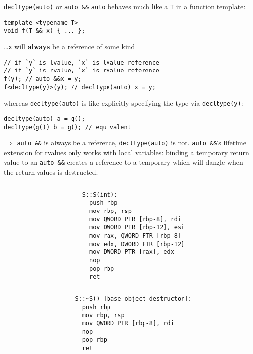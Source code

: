 \documentclass[compress,aspectratio=1610]{beamer}
\newcommand{\inputcpplisting}[1]{}
\begin{document}
\begin{frame}[fragile]{\texttt{decltype(auto)} or \texttt{auto \&\&}}
    \texttt{auto} behaves much like a \texttt{T} in a function template:
    \begin{lstlisting}
template <typename T>
void f(T && x) { ... };
    \end{lstlisting}
    \ldots \texttt{x} will \textbf{always} be a reference of some kind
    \begin{lstlisting}
// if `y` is lvalue, `x` is lvalue reference
// if `y` is rvalue, `x` is rvalue reference
f(y); // auto &&x = y;
f<decltype(y)>(y); // decltype(auto) x = y;
    \end{lstlisting}
    whereas \texttt{decltype(auto)} is like explicitly specifying the type via \texttt{decltype(y)}:
    \begin{lstlisting}
decltype(auto) a = g();
decltype(g()) b = g(); // equivalent
    \end{lstlisting}

    $\Rightarrow$ \texttt{auto \&\&} is always be a reference, \texttt{decltype(auto)} is not. \texttt{auto \&\&}'s lifetime extension for rvalues only works with local variables: binding a temporary return value to an \texttt{auto \&\&} creates a reference to a temporary which will dangle when the return values is destructed. 
\end{frame}

\begin{frame}[fragile]
    \begin{columns}
        \begin{column}{.5\textwidth}
            \inputcpplisting{snippet7}
        \end{column}
        \begin{column}{.4\textwidth}
            \begin{lstlisting}[language={},morekeywords={rdi}]
S::S(int):
  push rbp
  mov rbp, rsp
  mov QWORD PTR [rbp-8], rdi
  mov DWORD PTR [rbp-12], esi
  mov rax, QWORD PTR [rbp-8]
  mov edx, DWORD PTR [rbp-12]
  mov DWORD PTR [rax], edx
  nop
  pop rbp
  ret
            \end{lstlisting}
        \end{column}
    \end{columns}
\end{frame}

\begin{frame}[fragile]
    \begin{columns}
        \begin{column}{.5\textwidth}
            \inputcpplisting{snippet7}
        \end{column}
        \begin{column}{.4\textwidth}
            \begin{lstlisting}[language={},morekeywords={rdi}]
S::~S() [base object destructor]:
  push rbp
  mov rbp, rsp
  mov QWORD PTR [rbp-8], rdi
  nop
  pop rbp
  ret
            \end{lstlisting}
        \end{column}
    \end{columns}
\end{frame}
\end{document}
